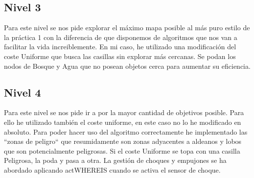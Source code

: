 \documentclass[12pt, spanish]{article}
\begin{document}
\subsection{Nivel 3}
Para este nivel se nos pide explorar el máximo mapa posible al más puro estilo de la práctica 1 con la diferencia de que disponemos de algoritmos que nos van a facilitar la vida increiblemente.
En mi caso, he utilizado una modificación del coste Uniforme que busca las casillas sin explorar más cercanas. Se podan los nodos de Bosque y Agua que no posean objetos cerca para aumentar su eficiencia.

\subsection{Nivel 4}
Para este nivel se nos pide ir a por la mayor cantidad de objetivos posible. Para ello he utilizado también el coste uniforme, en este caso no lo he modificado en absoluto. Para poder hacer uso del algoritmo correctamente he implementado las ``zonas de peligro`` que resumidamente son zonas adyacentes a aldeanos y lobos que son potencialmente peligrosas. Si el coste Uniforme se topa con una casilla Peligrosa, la poda y pasa a otra. La gestión de choques y empujones se ha abordado aplicando actWHEREIS cuando se activa el sensor de choque.


\vspace{5cm}
 
 
\end{document}
